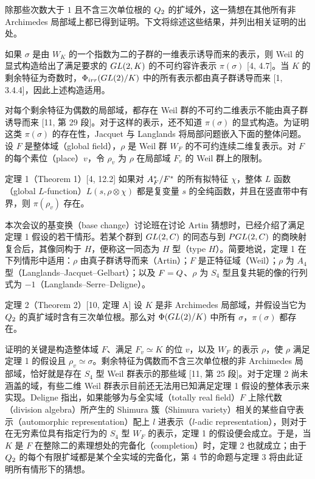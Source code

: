 除那些次数大于 $1$ 且不含三次单位根的 $Q_2$ 的扩域外，这一猜想在其他所有非 Archimedes 局部域上都已得到证明。下文将综述这些结果，并列出相关证明的出处。

如果 $\sigma$ 是由 $W_K$ 的一个指数为二的子群的一维表示诱导而来的表示，则 Weil 的显式构造给出了满足要求的 $GL(2,K)$ 的不可约容许表示 $\pi(\sigma)$ [4, 4.7]。当 $K$ 的剩余特征为奇数时，$\Phi_{irr}(GL(2)/K)$ 中的所有表示都由真子群诱导而来 [1, 3.4.4]，因此上述构造适用。

对每个剩余特征为偶数的局部域，都存在 Weil 群的不可约二维表示不能由真子群诱导而来 [11, 第 29 段]。对于这样的表示，还不知道 $\pi(\sigma)$ 的显式构造。为证明这类 $\pi(\sigma)$ 的存在性，Jacquet 与 Langlands 将局部问题嵌入下面的整体问题。设 $F$ 是整体域（global field），$\rho$ 是 Weil 群 $W_F$ 的不可约连续二维复表示。对 $F$ 的每个素位（place）$v$，令 $\rho_v$ 为 $\rho$ 在局部域 $F_v$ 的 Weil 群上的限制。

\begin{originaltheorem}{定理 1（Theorem 1）[4, 12.2]}
如果对 $A_F^*/F^*$ 的所有拟特征 $\chi$，整体 $L$ 函数（global $L$-function）$L(s,\rho\otimes\chi)$ 都是复变量 $s$ 的全纯函数，并且在竖直带中有界，则 $\pi(\rho_v)$ 存在。
\end{originaltheorem}

本次会议的基变换（base change）讨论班在讨论 Artin 猜想时，已经介绍了满足定理 1 假设的若干情形。若某个群到 $GL(2,C)$ 的同态与到 $PGL(2,C)$ 的商映射复合后，其像同构于 $H$，便称这一同态为 $H$ 型（type $H$）。简要地说，定理 1 在下列情形中适用：$\rho$ 由真子群诱导而来（Artin）；$F$ 是正特征域（Weil）；$\rho$ 为 $A_4$ 型（Langlands--Jacquet--Gelbart）；以及 $F=Q$、$\rho$ 为 $S_4$ 型且复共轭的像的行列式为 $-1$（Langlands--Serre--Deligne）。

\begin{originaltheorem}{定理 2（Theorem 2）[10, 定理 A]}
设 $K$ 是非 Archimedes 局部域，并假设当它为 $Q_2$ 的真扩域时含有三次单位根。那么对 $\Phi(GL(2)/K)$ 中所有 $\sigma$，$\pi(\sigma)$ 都存在。
\end{originaltheorem}

证明的关键是构造整体域 $F$、满足 $F_v\simeq K$ 的位 $v$，以及 $W_F$ 的表示 $\rho$，使 $\rho$ 满足定理 1 的假设且 $\rho_v\simeq\sigma$。剩余特征为偶数而不含三次单位根的非 Archimedes 局部域，恰好就是存在 $S_4$ 型 Weil 群表示的那些域 [11, 第 25 段]。对于定理 2 尚未涵盖的域，有些二维 Weil 群表示目前还无法用已知满足定理 1 假设的整体表示来实现。Deligne 指出，如果能够为与全实域（totally real field）$F$ 上除代数（division algebra）所产生的 Shimura 簇（Shimura variety）相关的某些自守表示（automorphic representation）配上 $l$ 进表示（$l$-adic representation），则对于在无穷素位具有指定行为的 $S_4$ 型 $W_F$ 的表示，定理 1 的假设便会成立。于是，当 $K$ 是 $F$ 在整除二的素理想处的完备化（completion）时，定理 2 也就成立；由于 $Q_2$ 的每个有限扩域都是某个全实域的完备化，第 4 节的命题与定理 3 将由此证明所有情形下的猜想。

